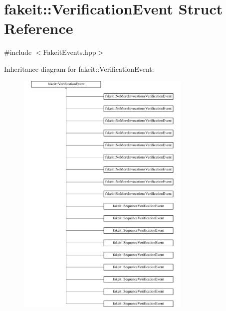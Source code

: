 \hypertarget{structfakeit_1_1VerificationEvent}{}\section{fakeit\+::Verification\+Event Struct Reference}
\label{structfakeit_1_1VerificationEvent}


{\ttfamily \#include $<$Fakeit\+Events.\+hpp$>$}

Inheritance diagram for fakeit\+::Verification\+Event\+:\begin{figure}[H]
\begin{center}
\leavevmode
\includegraphics[height=12.000000cm]{structfakeit_1_1VerificationEvent}
\end{center}
\end{figure}
